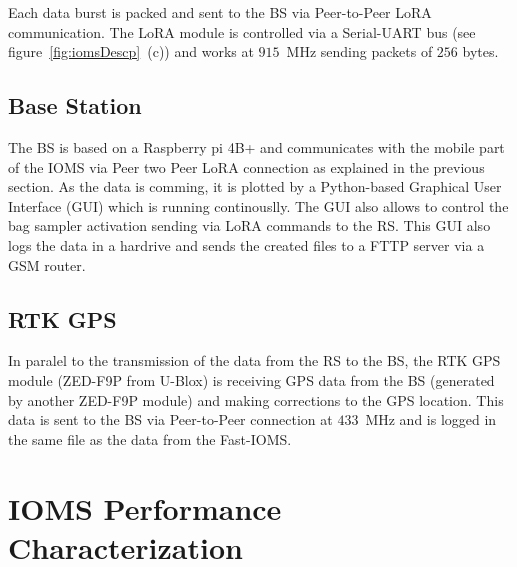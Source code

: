 \documentclass[lettersize,journal]{IEEEtran}
\begin{document}
Each data burst is packed and sent to the BS via Peer-to-Peer LoRA communication. The LoRA module is controlled via a Serial-UART bus (see figure~\ref{fig:iomsDescp}~(c)) and works at $915$~MHz sending packets of $256$ bytes.

\subsection{Base Station}
\label{ssec:baseStation}

The BS is based on a Raspberry pi 4B+ and communicates with the mobile part of the IOMS via Peer two Peer LoRA connection as explained in the previous section. As the data is comming, it is plotted by a Python-based Graphical User Interface (GUI) which is running continouslly. The GUI also allows to control the bag sampler activation sending via LoRA commands to the RS. This GUI also logs the data in a hardrive and sends the created files to a FTTP server via a GSM router.

\subsection{RTK GPS}
\label{ssec:rtkGPS}
In paralel to the transmission of the data from the RS to the BS, the RTK GPS module (ZED-F9P from U-Blox) is receiving GPS data from the BS (generated by another ZED-F9P module) and making corrections to the GPS location. This data is sent to the BS via Peer-to-Peer connection at $433$~MHz and is logged in the same file as the data from the Fast-IOMS. 

\section{IOMS Performance Characterization}
\label{sec:labChar}
\end{document}
